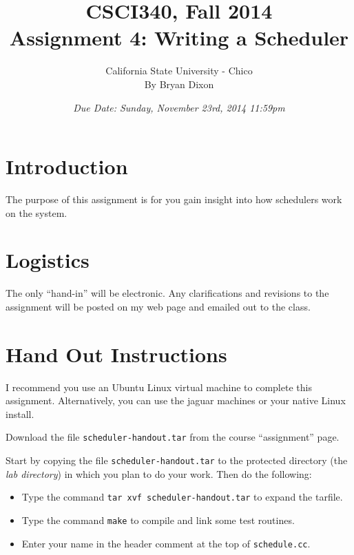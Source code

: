 \documentclass[11pt]{article}
\begin{document}
\title{CSCI340, Fall 2014\\
Assignment 4: Writing a Scheduler
}

\author{California State University - Chico\\
  By Bryan Dixon\\
}
\date{\emph{Due Date: Sunday, November 23rd, 2014 11:59pm}}


\maketitle

\section*{Introduction}
The purpose of this assignment is for you gain insight into how schedulers work on the system. 

\section*{Logistics}

The only ``hand-in'' will be
electronic.  Any clarifications and revisions to the assignment will
be posted on my web page and emailed out to the class.

\section*{Hand Out Instructions}

I recommend you use an Ubuntu Linux virtual machine to complete this
assignment.  Alternatively, you can use the jaguar machines or your native Linux install. 

Download the file \texttt{scheduler-handout.tar} from the course
``assignment'' page.

Start by copying the file {\tt scheduler-handout.tar}
to the protected directory (the {\em lab directory}) in which you plan
to do your work.  Then do the following:

\begin{itemize}
\item Type the command {\tt tar xvf scheduler-handout.tar} 
to expand the tarfile.

\item Type the command {\tt make} to compile and link some
test routines.

\item Enter your name in the header
comment at the top of {\tt schedule.cc}.

\end{itemize}
\end{document}
